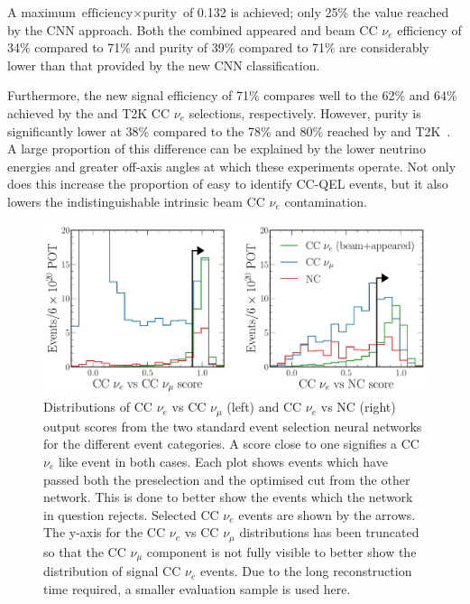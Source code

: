 A maximum $\text{efficiency}\times\text{purity}$ of 0.132 is achieved; only 25\% the value reached
by the CNN approach. Both the combined appeared and beam CC $\nu_{e}$ efficiency of 34\% compared
to 71\% and purity of 39\% compared to 71\% are considerably lower than that provided by the new
CNN classification.

Furthermore, the new signal efficiency of 71\% compares well to the 62\% and 64\% achieved by the
\nova and T2K CC $\nu_{e}$ selections, respectively. However, purity is significantly lower at
38\% compared to the 78\% and 80\% reached by \nova and T2K~\cite{acero2019, abe2015}. A large
proportion of this difference can be explained by the lower neutrino energies and greater off-axis
angles at which these experiments operate. Not only does this increase the proportion of easy to
identify CC-QEL events, but it also lowers the indistinguishable intrinsic beam CC $\nu_{e}$
contamination.

\begin{figure} %
    \includegraphics[width=\textwidth]{diagrams/7-results/final_old_pid_outputs.pdf}
    \caption[Distributions of standard event selection neural network output scores]
    {Distributions of CC $\nu_{e}$ vs CC $\nu_{\mu}$ (left) and CC $\nu_{e}$ vs NC (right) output
        scores from the two standard event selection neural networks for the different event
        categories. A score close to one signifies a CC $\nu_{e}$ like event in both cases. Each
        plot shows events which have passed both the preselection and the optimised cut from the
        other network. This is done to better show the events which the network in question
        rejects. Selected CC $\nu_{e}$ events are shown by the arrows. The y-axis for the CC
        $\nu_{e}$ vs CC $\nu_{\mu}$ distributions has been truncated so that the CC $\nu_{\mu}$
        component is not fully visible to better show the distribution of signal CC $\nu_{e}$
        events. Due to the long reconstruction time required, a smaller evaluation sample is used
        here.}
    \label{fig:final_old_pid_outputs}
\end{figure}

